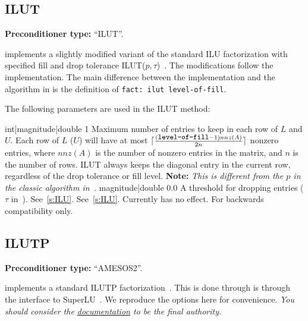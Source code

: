 \subsection{ILUT}\label{s:ILUT}

\textbf{Preconditioner type:} ``ILUT''.

\ifpacktwo{} implements a slightly modified variant of the standard ILU factorization with specified fill and
drop tolerance ILUT($p,\tau$)~\cite{Saad1994}. The modifications follow the \aztecoo implementation.
The main difference between the \ifpacktwo implementation and the algorithm in \cite{Saad1994} is the definition of
\texttt{fact: ilut level-of-fill}.

The following parameters are used in the ILUT method:

    {int|magnitude|double}
    {1}
    {Maximum number of entries to keep in each row of $L$ and $U$. Each row of
     $L$ ($U$) will have at most $\lceil\frac{(\mbox{\small\tt
     level-of-fill}-1)nnz(A)}{2n}\rceil$ nonzero entries, where $nnz(A)$ is the
     number of nonzero entries in the matrix, and $n$ is the number of rows.
     ILUT always keeps the diagonal entry in the current row, regardless of the
     drop tolerance or fill level. \textbf{Note:} \textit{This is
     different from the $p$ in the classic algorithm in~\cite{Saad1994}.}}
    {magnitude|double}
    {0.0}
    {A threshold for dropping entries ($\tau$ in~\cite{Saad1994}).}
    {See~\ref{s:ILU}.}
    {See~\ref{s:ILU}.}
    {Currently has no effect. For backwards compatibility only.}

\subsection{ILUTP}\label{s:ILUTP}

\textbf{Preconditioner type:} ``AMESOS2''.


\ifpacktwo{} implements a standard ILUTP factorization~\cite{Saad2003}. This is
done through is through the \amesostwo interface to SuperLU~\cite{Li2011}. We
reproduce the \amesostwo options here for convenience. {\em You should consider
the \href{http://trilinos.org/docs/dev/packages/amesos2/doc/html/group__amesos2__solver__parameters.html#superlu_parameters}{\amesostwo
documentation} to be the final authority.}

